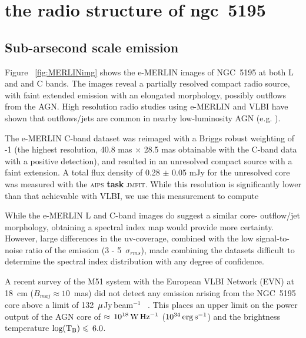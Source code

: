 \documentclass[fleqn,usenatbib]{mnras}
\def\Fig{Figure}
\def\mujybm   {${\rm \mu}$Jy\,beam$^{-1}$}
\begin{document}
\section{the radio structure of ngc~5195}

\subsection{Sub-arsecond scale emission}

\Fig~ \ref{fig:MERLINimg} shows the e-MERLIN images of NGC~5195 at both L and  and C bands. The 
images reveal a partially resolved compact radio source, with faint extended emission with an 
elongated morphology, possibly outflows from the AGN. High resolution radio studies using 
e-MERLIN and VLBI have shown that outflows/jets are common in nearby low-luminosity AGN (e.g. 
\citealt{Krips+2007,GP09}). 

The e-MERLIN C-band dataset was reimaged with a Briggs robust weighting of -1 (the highest 
resolution, 40.8 mas $\times$ 28.5 mas obtainable with the C-band data with a positive 
detection), and resulted in an unresolved compact source with a faint extension. A total flux 
density of 0.28 $\pm$ 0.05 mJy for the unresolved core was measured with the \textsc{aips} \textbf{task} \textsc{jmfit}. While this resolution  is significantly  lower than that 
achievable with VLBI, we use this measurement to compute



While the e-MERLIN L and C-band images do suggest a similar core-
outflow/jet morphology, obtaining a spectral index map would provide more certainty. However, 
large differences in the uv-coverage, combined with the low signal-to-noise ratio of the 
emission (3 - 5~$\sigma_{rms}$), made combining the datasets difficult to determine the 
spectral index distribution with any degree of confidence. 

A recent survey of the M51 system with the European 
VLBI Network (EVN) at 18~cm ($B_{maj} \approx 10$~mas) did not detect any emission arising from 
the NGC~5195 core above a limit of 132~\mujybm~ \citep{Rampadarathetal15}. This places an upper 
limit on the power output of the AGN core of $\approx\,10^{18}\,{\rm W\,Hz^{-1}}$ 
($10^{34}\,{\rm erg\,s^{-1}}$) and the brightness temperature ${\rm log(T_{B})}\leq\,6.0$. 
\end{document}
